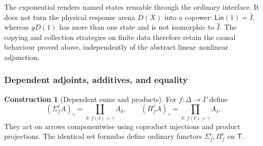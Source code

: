 \documentclass[11pt,a4paper]{article}
\numberwithin{equation}{section}
\theoremstyle{definition}
\newtheorem{construction}[construction]{Construction}
\theoremstyle{remark}
\theoremstyle{plain}
\begin{document}
The exponential renders named states reusable through the ordinary
interface. It does not turn the physical response arena $D(X)$ into a
copower: $\mathsf{Lin}(1)=\widehat I$, whereas $yD(1)$ has more than one
state and is not isomorphic to $\widehat I$. The copying and collection
strategies on finite data therefore retain the causal behaviour proved
above, independently of the abstract linear--nonlinear adjunction.

\subsubsection{Dependent adjoints, additives, and equality}

\begin{construction}[Dependent sums and products]
\label{con:egt-linear-dependent-adjoints}
For $f:\Delta\to\Gamma$ define
\[
 (\Sigma_f^\ell A)_\gamma
       =\coprod_{\delta:\,f(\delta)=\gamma}A_\delta,
 \qquad
 (\Pi_f^\ell A)_\gamma
       =\prod_{\delta:\,f(\delta)=\gamma}A_\delta.
\]
They act on arrows componentwise using coproduct injections and product
projections. The identical set formulas define ordinary functors
$\Sigma_f^{\mathrm c},\Pi_f^{\mathrm c}$ on $\mathsf T$.
\end{construction}
\end{document}
